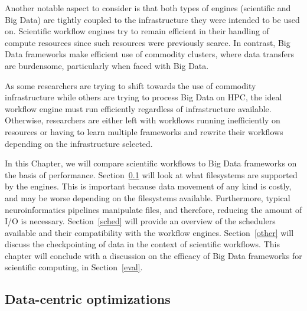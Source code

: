         Another notable aspect to consider is that both types of engines 
        (scientific and Big Data) are tightly coupled to the infrastructure
        they were intended to be used on. Scientific workflow engines
        try to remain efficient in their handling of compute resources since such
        resources were previously scarce. In contrast, Big Data frameworks 
        make efficient use of commodity clusters, where data transfers are 
        burdensome, particularly when faced with Big Data.

        As some researchers are trying to shift towards the use of commodity 
        infrastructure while others are trying to process Big Data on HPC, the 
        ideal workflow engine must run efficiently regardless of 
        infrastructure available. Otherwise, researchers are either left with
        workflows running inefficiently on resources or having to learn 
        multiple frameworks and rewrite their workflows depending on the 
        infrastructure selected.
 
        In this Chapter, we will compare scientific
        workflows to Big Data frameworks on the basis of performance. 
        Section~\ref{fs} will look at what filesystems are supported by the 
        engines. This is important because data movement of any kind is costly,
        and may be worse depending on the filesystems available. Furthermore, 
        typical neuroinformatics pipelines manipulate files, and therefore, 
        reducing the amount of I/O is necessary.
        Section~\ref{sched} will provide an overview of the schedulers 
        available and their compatibility with the workflow engines. 
        Section~\ref{other} will discuss the checkpointing of data in the context
        of scientific workflows. This chapter will conclude with a discussion
        on the efficacy of Big Data frameworks for scientific computing, in
        Section~\ref{eval}.
        
 
        \subsection{Data-centric optimizations}\label{fs}
            

